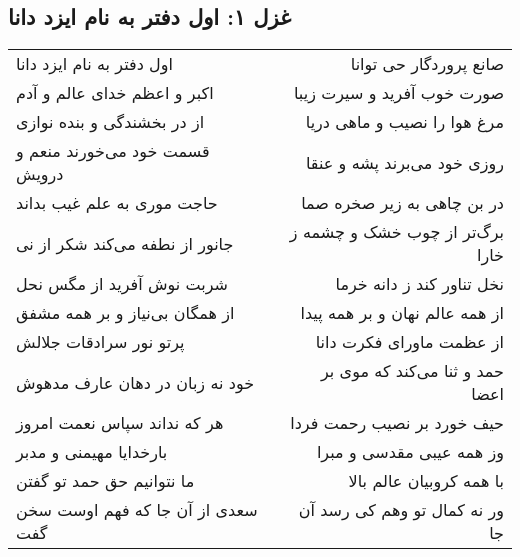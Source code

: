 \begin{center}
\section*{غزل ۱: اول دفتر به نام ایزد دانا}
\label{sec:001}
\begin{longtable}{l p{0.5cm} r}
اول دفتر به نام ایزد دانا
&&
صانع پروردگار حی توانا
\\
اکبر و اعظم خدای عالم و آدم
&&
صورت خوب آفرید و سیرت زیبا
\\
از در بخشندگی و بنده نوازی
&&
مرغ هوا را نصیب و ماهی دریا
\\
قسمت خود می‌خورند منعم و درویش
&&
روزی خود می‌برند پشه و عنقا
\\
حاجت موری به علم غیب بداند
&&
در بن چاهی به زیر صخره صما
\\
جانور از نطفه می‌کند شکر از نی
&&
برگ‌تر از چوب خشک و چشمه ز خارا
\\
شربت نوش آفرید از مگس نحل
&&
نخل تناور کند ز دانه خرما
\\
از همگان بی‌نیاز و بر همه مشفق
&&
از همه عالم نهان و بر همه پیدا
\\
پرتو نور سرادقات جلالش
&&
از عظمت ماورای فکرت دانا
\\
خود نه زبان در دهان عارف مدهوش
&&
حمد و ثنا می‌کند که موی بر اعضا
\\
هر که نداند سپاس نعمت امروز
&&
حیف خورد بر نصیب رحمت فردا
\\
بارخدایا مهیمنی و مدبر
&&
وز همه عیبی مقدسی و مبرا
\\
ما نتوانیم حق حمد تو گفتن
&&
با همه کروبیان عالم بالا
\\
سعدی از آن جا که فهم اوست سخن گفت
&&
ور نه کمال تو وهم کی رسد آن جا
\\
\end{longtable}
\end{center}
